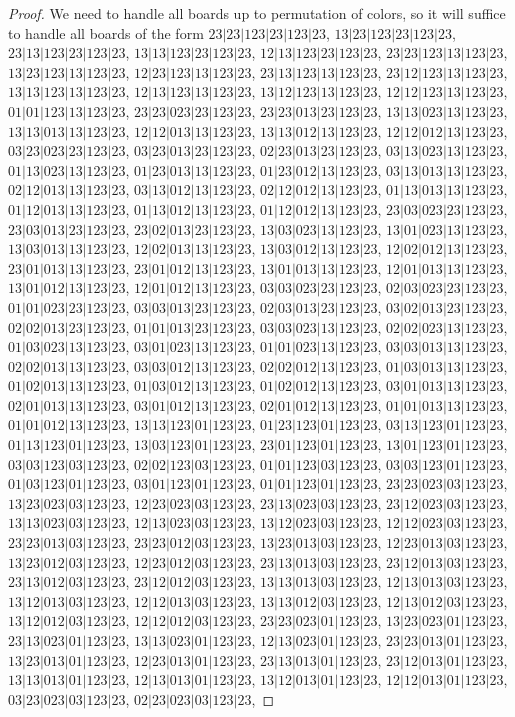 \documentclass[12pt]{article}
\theoremstyle{plain}
\theoremstyle{definition}
\theoremstyle{remark}
\begin{document}
\begin{proof}
	We need to handle all boards up to permutation of colors, so it will suffice to handle all boards of the form $23|23|123|23|123|23$, $13|23|123|23|123|23$, $23|13|123|23|123|23$, $13|13|123|23|123|23$, $12|13|123|23|123|23$, $23|23|123|13|123|23$, $13|23|123|13|123|23$, $12|23|123|13|123|23$, $23|13|123|13|123|23$, $23|12|123|13|123|23$, $13|13|123|13|123|23$, $12|13|123|13|123|23$, $13|12|123|13|123|23$, $12|12|123|13|123|23$, $01|01|123|13|123|23$, $23|23|023|23|123|23$, $23|23|013|23|123|23$, $13|13|023|13|123|23$, $13|13|013|13|123|23$, $12|12|013|13|123|23$, $13|13|012|13|123|23$, $12|12|012|13|123|23$, $03|23|023|23|123|23$, $03|23|013|23|123|23$, $02|23|013|23|123|23$, $03|13|023|13|123|23$, $01|13|023|13|123|23$, $01|23|013|13|123|23$, $01|23|012|13|123|23$, $03|13|013|13|123|23$, $02|12|013|13|123|23$, $03|13|012|13|123|23$, $02|12|012|13|123|23$, $01|13|013|13|123|23$, $01|12|013|13|123|23$, $01|13|012|13|123|23$, $01|12|012|13|123|23$, $23|03|023|23|123|23$, $23|03|013|23|123|23$, $23|02|013|23|123|23$, $13|03|023|13|123|23$, $13|01|023|13|123|23$, $13|03|013|13|123|23$, $12|02|013|13|123|23$, $13|03|012|13|123|23$, $12|02|012|13|123|23$, $23|01|013|13|123|23$, $23|01|012|13|123|23$, $13|01|013|13|123|23$, $12|01|013|13|123|23$, $13|01|012|13|123|23$, $12|01|012|13|123|23$, $03|03|023|23|123|23$, $02|03|023|23|123|23$, $01|01|023|23|123|23$, $03|03|013|23|123|23$, $02|03|013|23|123|23$, $03|02|013|23|123|23$, $02|02|013|23|123|23$, $01|01|013|23|123|23$, $03|03|023|13|123|23$, $02|02|023|13|123|23$, $01|03|023|13|123|23$, $03|01|023|13|123|23$, $01|01|023|13|123|23$, $03|03|013|13|123|23$, $02|02|013|13|123|23$, $03|03|012|13|123|23$, $02|02|012|13|123|23$, $01|03|013|13|123|23$, $01|02|013|13|123|23$, $01|03|012|13|123|23$, $01|02|012|13|123|23$, $03|01|013|13|123|23$, $02|01|013|13|123|23$, $03|01|012|13|123|23$, $02|01|012|13|123|23$, $01|01|013|13|123|23$, $01|01|012|13|123|23$, $13|13|123|01|123|23$, $01|23|123|01|123|23$, $03|13|123|01|123|23$, $01|13|123|01|123|23$, $13|03|123|01|123|23$, $23|01|123|01|123|23$, $13|01|123|01|123|23$, $03|03|123|03|123|23$, $02|02|123|03|123|23$, $01|01|123|03|123|23$, $03|03|123|01|123|23$, $01|03|123|01|123|23$, $03|01|123|01|123|23$, $01|01|123|01|123|23$, $23|23|023|03|123|23$, $13|23|023|03|123|23$, $12|23|023|03|123|23$, $23|13|023|03|123|23$, $23|12|023|03|123|23$, $13|13|023|03|123|23$, $12|13|023|03|123|23$, $13|12|023|03|123|23$, $12|12|023|03|123|23$, $23|23|013|03|123|23$, $23|23|012|03|123|23$, $13|23|013|03|123|23$, $12|23|013|03|123|23$, $13|23|012|03|123|23$, $12|23|012|03|123|23$, $23|13|013|03|123|23$, $23|12|013|03|123|23$, $23|13|012|03|123|23$, $23|12|012|03|123|23$, $13|13|013|03|123|23$, $12|13|013|03|123|23$, $13|12|013|03|123|23$, $12|12|013|03|123|23$, $13|13|012|03|123|23$, $12|13|012|03|123|23$, $13|12|012|03|123|23$, $12|12|012|03|123|23$, $23|23|023|01|123|23$, $13|23|023|01|123|23$, $23|13|023|01|123|23$, $13|13|023|01|123|23$, $12|13|023|01|123|23$, $23|23|013|01|123|23$, $13|23|013|01|123|23$, $12|23|013|01|123|23$, $23|13|013|01|123|23$, $23|12|013|01|123|23$, $13|13|013|01|123|23$, $12|13|013|01|123|23$, $13|12|013|01|123|23$, $12|12|013|01|123|23$, $03|23|023|03|123|23$, $02|23|023|03|123|23$, 
\end{proof}
\end{document}
